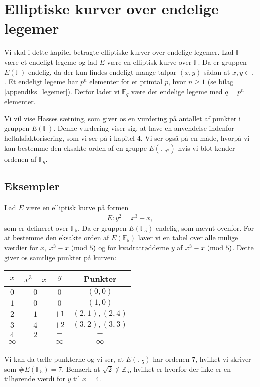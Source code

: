 \chapter{Elliptiske kurver over endelige legemer}

Vi skal i dette kapitel betragte elliptiske kurver over endelige legemer. Lad $\mathbb{F}$ være et endeligt legeme og lad $E$ være en elliptisk kurve over $\mathbb{F}$. Da er gruppen $E(\mathbb{F})$ endelig, da der kun findes endeligt mange talpar $(x, y)$ sådan at $x, y \in \mathbb{F}$. Et endeligt legeme har $p^n$ elementer for et primtal $p$, hvor $n \geq 1$ (se bilag \ref{appendiks_legemer}). Derfor lader vi $\mathbb{F}_{q}$ være det endelige legeme med $q = p^n$ elementer. 

Vi vil vise Hasses sætning, som giver os en vurdering på antallet af punkter i gruppen $E(\mathbb{F})$. Denne vurdering viser sig, at have en anvendelse indenfor heltalsfaktorisering, som vi ser på i kapitel 4. Vi ser også på en måde, hvorpå vi kan bestemme den eksakte orden af en gruppe $E(\mathbb{F}_{q^n})$ hvis vi blot kender ordenen af $\mathbb{F}_{q}$.


\section{Eksempler}

Lad $E$ være en elliptisk kurve på formen
\begin{align*}
	E : y^2 = x^3 - x,
\end{align*}
som er defineret over $\mathbb{F}_5$. Da er gruppen $E(\mathbb{F}_5)$ endelig, som nævnt ovenfor. For at bestemme den eksakte orden af $E(\mathbb{F}_5)$ laver vi en tabel over alle mulige værdier for $x$, $x^3-x \ (\mathrm{mod} \ 5)$ og for kvadratrødderne $y$ af $x^3 - x \ (\mathrm{mod} \ 5)$. Dette giver os samtlige punkter på kurven:
\begin{center}
\begin{tabular}{c c c c }
$x$ & $x^3 - x$ & $y$ & Punkter \\ 
\hline
$0$ & $0$ & $0$ & $(0, 0)$ \\ 
$1$ & $0$ & $0$ & $(1, 0)$ \\ 
$2$ & $1$ & $\pm 1$ & $(2, 1), (2, 4)$ \\ 
$3$ & $4$ & $\pm 2$ & $(3, 2), (3, 3)$ \\ 
$4$ & $2$ & $-$ & $-$ \\ 
$\infty$ & & $\infty$ & $\infty$ \\
\end{tabular} 
\end{center}
Vi kan da tælle punkterne og vi ser, at $E(\mathbb{F}_5)$ har ordenen $7$, hvilket vi skriver som 
$\#E(\mathbb{F}_5) = 7$. Bemærk at $\sqrt{2} \notin \mathbb{Z}_5$, hvilket er hvorfor der ikke er en tilhørende værdi for $y$ til $x=4$.

